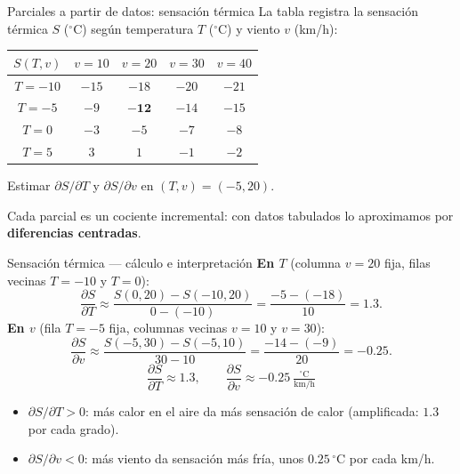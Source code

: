 \documentclass[11pt,aspectratio=169]{beamer}
\begin{document}
\begin{frame}{Parciales a partir de datos: sensación térmica}
  La tabla registra la sensación térmica $S$ ($^\circ$C) según temperatura $T$ ($^\circ$C) y viento $v$ (km/h):
  \begin{center}
  \begin{tabular}{c|cccc}
    \toprule
    $S(T,v)$ & $v=10$ & $v=20$ & $v=30$ & $v=40$ \\
    \midrule
    $T=-10$  & $-15$ & $-18$ & $-20$ & $-21$ \\
    $T=-5$   & $-9$  & \textcolor{brick}{$\mathbf{-12}$}  & $-14$ & $-15$ \\
    $T=0$    & $-3$  & $-5$  & $-7$  & $-8$  \\
    $T=5$    & $3$   & $1$   & $-1$  & $-2$  \\
    \bottomrule
  \end{tabular}
  \end{center}
  \vspace{6pt}
  \pause
  \begin{center}
  Estimar $\partial S/\partial T$ y $\partial S/\partial v$ en $(T,v)=(-5,20)$.
  \end{center}
  \vspace{4pt}
  \pause
  \begin{center}\small\color{gray60} Cada parcial es un cociente incremental: con datos tabulados lo aproximamos por \textbf{diferencias centradas}.\end{center}
\end{frame}

\begin{frame}{Sensación térmica --- cálculo e interpretación}
  \textbf{En $T$} (columna $v=20$ fija, filas vecinas $T=-10$ y $T=0$):
  \[
    \frac{\partial S}{\partial T}\approx\frac{S(0,20)-S(-10,20)}{0-(-10)}=\frac{-5-(-18)}{10}=1.3.
  \]
  \pause
  \textbf{En $v$} (fila $T=-5$ fija, columnas vecinas $v=10$ y $v=30$):
  \[
    \frac{\partial S}{\partial v}\approx\frac{S(-5,30)-S(-5,10)}{30-10}=\frac{-14-(-9)}{20}=-0.25.
  \]
  \pause
  \[
    \boxed{\frac{\partial S}{\partial T}\approx 1.3,\qquad
           \frac{\partial S}{\partial v}\approx -0.25\ \tfrac{^\circ\mathrm{C}}{\mathrm{km/h}}}
  \]
  \pause
  \begin{itemize}
    \item[] {\small $\partial S/\partial T>0$: más calor en el aire da más sensación de calor (amplificada: $1.3$ por cada grado).}
    \item[] {\small $\partial S/\partial v<0$: más viento da sensación más fría, unos $0.25\,^\circ$C por cada km/h.}
  \end{itemize}
\end{frame}
\end{document}
